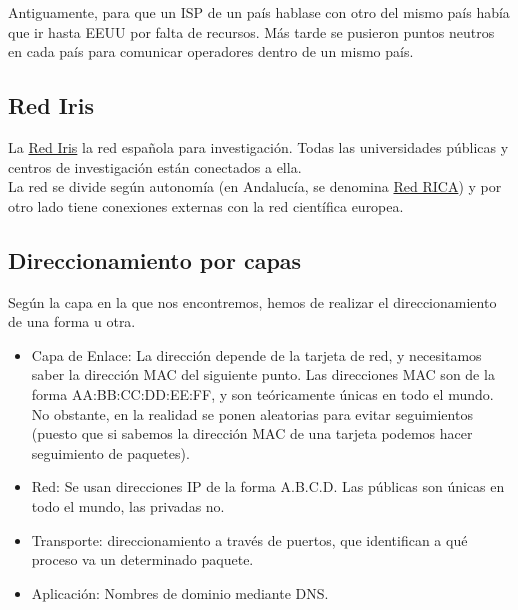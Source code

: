 Antiguamente, para que un \acrshort{ISP} de un país hablase con otro del mismo país había que ir hasta EEUU por falta de recursos. Más tarde se pusieron puntos neutros en cada país para comunicar operadores dentro de un mismo país.

\subsection{Red Iris}

La \href{https://www.rediris.es/}{Red Iris} la red española para investigación. Todas las universidades públicas y centros de investigación están conectados a ella. \\

La red se divide según autonomía (en Andalucía, se denomina \href{https://www.cica.es/red-rica/trafico-rica/}{Red RICA}) y por otro lado tiene conexiones externas con la red científica europea. 


\subsection{Direccionamiento por capas}
Según la capa en la que nos encontremos, hemos de realizar el direccionamiento de una forma u otra.
\begin{itemize}
    \item Capa de Enlace: La dirección depende de la tarjeta de red, y necesitamos saber la dirección \acrshort{MAC} del siguiente punto. Las direcciones \acrshort{MAC} son de la forma AA\@:BB\@:CC\@:DD\@:EE\@:FF\@, y son teóricamente únicas en todo el mundo. No obstante, en la realidad se ponen aleatorias para evitar seguimientos (puesto que si sabemos la dirección \acrshort{MAC} de una tarjeta podemos hacer seguimiento de paquetes).
    \item Red: Se usan direcciones \acrshort{IP} de la forma A\@.B\@.C\@.D\@. Las públicas son únicas en todo el mundo, las privadas no.
    \item Transporte: direccionamiento a través de puertos, que identifican a qué proceso va un determinado paquete. 
    \item Aplicación: Nombres de dominio mediante \acrshort{DNS}.
\end{itemize}